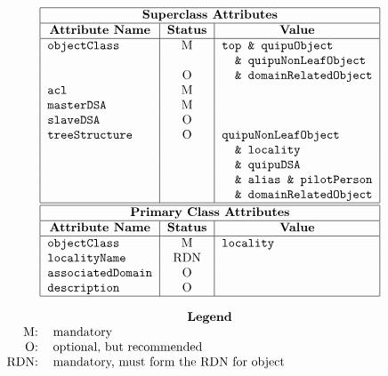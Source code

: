 
\smaller

\[\begin{tabular}{|l|c|l|}
\hline
\multicolumn{3}{|c|}{\bf Superclass Attributes}\\
\hline
\multicolumn{1}{|c|}{\bf Attribute Name}&
			\multicolumn{1}{c|}{\bf Status}&
				\multicolumn{1}{c|}{\bf Value}\\
\hline
\verb"objectClass"&	M&	\verb"top & quipuObject"\\
&			&	\verb"  & quipuNonLeafObject"\\
&			O&	\verb"  & domainRelatedObject"\\
\verb"acl"&		M&	\\
\verb"masterDSA"&	M&	\\
\verb"slaveDSA"&	O&	\\
\verb"treeStructure"&	O&	\verb"quipuNonLeafObject"\\
&			&	\verb"  & locality"\\
&			&	\verb"  & quipuDSA"\\
&			&	\verb"  & alias & pilotPerson"\\
&			&	\verb"  & domainRelatedObject"\\
\hline
\hline
\multicolumn{3}{|c|}{\bf Primary Class Attributes}\\
\hline
\multicolumn{1}{|c|}{\bf Attribute Name}&
			\multicolumn{1}{c|}{\bf Status}&
				\multicolumn{1}{c|}{\bf Value}\\
\hline
\verb"objectClass"&	M&	\verb"locality"\\
\verb"localityName"&	RDN&	\\
\verb"associatedDomain"&
			O&	\\
\verb"description"&	O&	\\
\hline
\end{tabular}\]

\[\begin{tabular}{rp{4in}}
\multicolumn{2}{c}{\bf Legend}\\
M:&	mandatory\\
O:&	optional, but recommended\\
RDN:&	mandatory, must form the RDN for object
\end{tabular}\]
